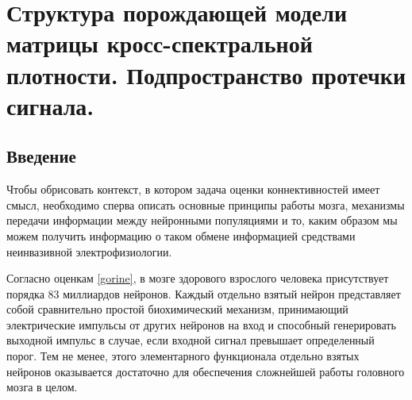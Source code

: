 \chapter{Структура порождающей модели матрицы кросс-спектральной плотности.
         Подпространство протечки сигнала.} \label{chapt1}

\section{Введение}



Чтобы обрисовать контекст, в котором задача оценки коннективностей имеет смысл,
необходимо сперва описать основные принципы работы мозга, механизмы передачи
информации между нейронными популяциями и то, каким образом мы можем получить
информацию о таком обмене информацией средствами неинвазивной электрофизиологии.

Согласно оценкам \ref{gorine}, в мозге здорового взрослого человека присутствует
порядка 83 миллиардов нейронов. Каждый отдельно взятый нейрон представляет собой
сравнительно простой биохимический механизм, принимающий электрические импульсы
от других нейронов на вход и способный генерировать выходной импульс в случае,
если входной сигнал превышает определенный порог. Тем не менее, этого элементарного
функционала отдельно взятых нейронов оказывается достаточно для обеспечения сложнейшей работы
головного мозга в целом.

